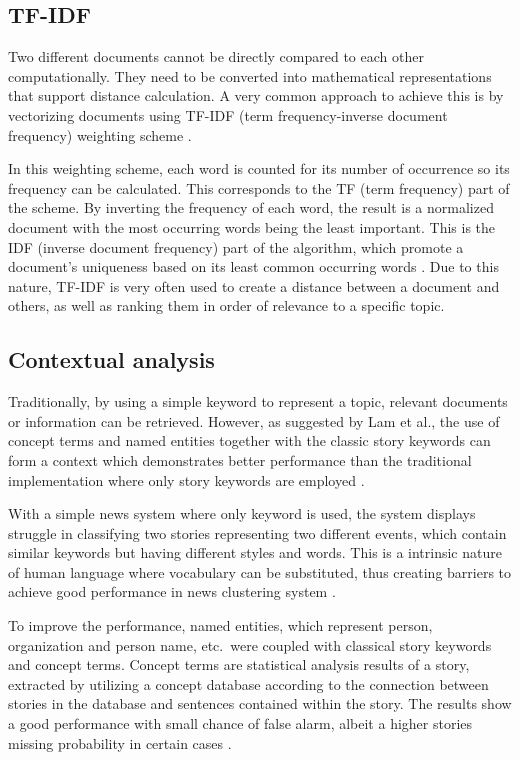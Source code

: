 \documentclass[english]{tktltiki}
\begin{document}
\subsection{TF-IDF}

Two different documents cannot be directly compared to each other computationally. They need to be converted into mathematical representations that support distance calculation. A very common approach to achieve this is by vectorizing documents using TF-IDF (term frequency-inverse document frequency) weighting scheme \cite[p.~319]{Beel2016}.

In this weighting scheme, each word is counted for its number of occurrence so its frequency can be calculated. This corresponds to the TF (term frequency) part of the scheme. By inverting the frequency of each word, the result is a normalized document with the most occurring words being the least important. This is the IDF (inverse document frequency) part of the algorithm, which promote a document's uniqueness based on its least common occurring words \cite[p.~80]{Aggarwal2012}. Due to this nature, TF-IDF is very often used to create a distance between a document and others, as well as ranking them in order of relevance to a specific topic.

\subsection{Contextual analysis}

Traditionally, by using a simple keyword to represent a topic, relevant documents or information can be retrieved. However, as suggested by Lam et al., the use of concept terms and named entities together with the classic story keywords can form a context which demonstrates better performance than the traditional implementation where only story keywords are employed \cite[p.~525]{INT:INT1022}.

With a simple news system where only keyword is used, the system displays struggle in classifying two stories representing two different events, which contain similar keywords but having different styles and words. This is a intrinsic nature of human language where vocabulary can be substituted, thus creating barriers to achieve good performance in news clustering system \cite[p.~527]{INT:INT1022}.

To improve the performance, named entities, which represent person, organization and person name, etc.\ were coupled with classical story keywords and concept terms. Concept terms are statistical analysis results of a story, extracted by utilizing a concept database according to the connection between stories in the database and sentences contained within the story. The results show a good performance with small chance of false alarm, albeit a higher stories missing probability in certain cases \cite[p.~544--545]{INT:INT1022}.
\end{document}
